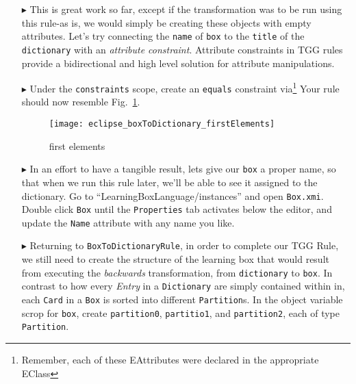 \begin{itemize}
\item[$\blacktriangleright$] This is great work so far, except if the transformation was to be run using this rule-as is, we would simply be creating these
objects with empty attributes. Let's try connecting the \texttt{name} of \texttt{box} to the \texttt{title} of the \texttt{dictionary} with an \emph{attribute
constraint}. Attribute constraints in TGG rules provide a bidirectional and high level solution for attribute manipulations.

\item[$\blacktriangleright$] Under the \texttt{constraints} scope, create an \texttt{equals} constraint via\footnote{Remember, each of these EAttributes were
declared in the appropriate EClass}
Your rule should now resemble Fig.~\ref{fig:ruleBasic}.

\begin{figure}[htbp]
\begin{center}
  \texttt{[image: eclipse\_boxToDictionary\_firstElements]}
  \caption{first elements}
  \label{fig:ruleBasic}
\end{center}
\end{figure}

\item[$\blacktriangleright$] In an effort to have a tangible result, lets give our \texttt{box} a proper name, so that when we run this rule later, we'll be
able to see it assigned to the dictionary. Go to ``LearningBoxLanguage/instances'' and open \texttt{Box.xmi}. Double click \texttt{Box} until the
\texttt{Properties} tab activates below the editor, and update the \texttt{Name} attribute with any name you like.


\item[$\blacktriangleright$] Returning to \texttt{BoxToDictionaryRule}, in order to complete our TGG Rule, we still need to create the structure of the learning
box that would result from executing the \emph{backwards} transformation, from \texttt{dictionary} to \texttt{box}. In contrast to how every \emph{Entry} in a
\texttt{Dictionary} are simply contained within in, each \texttt{Card} in a \texttt{Box} is sorted into different \texttt{Partition}s. In the object variable
scrop for \texttt{box}, create \texttt{partition0}, \texttt{partitio1}, and \texttt{partition2}, each of type \texttt{Partition}. 


\end{itemize}
